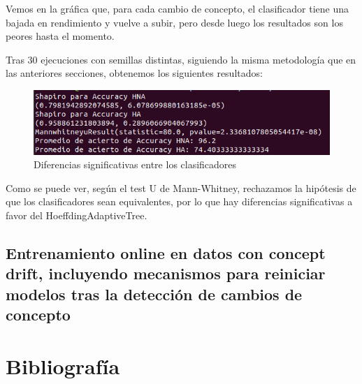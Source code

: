 Vemos en la gráfica que, para cada cambio de concepto, el clasificador tiene una bajada en rendimiento y vuelve a subir, pero desde luego los resultados son los peores hasta el momento.

Tras 30 ejecuciones con semillas distintas, siguiendo la misma metodología que en las anteriores secciones, obtenemos los siguientes resultados:

\begin{figure}[H] %
	\centering
	\includegraphics[scale=0.5]{test4.png}  %
	\caption{Diferencias significativas entre los clasificadores} 
	\label{fig:test4}
\end{figure}

Como se puede ver, según el test U de Mann-Whitney, rechazamos la hipótesis de que los clasificadores sean equivalentes, por lo que hay diferencias significativas a favor del HoeffdingAdaptiveTree.
\subsection{Entrenamiento online en datos con concept drift, incluyendo mecanismos para reiniciar modelos tras la detección de cambios de concepto}




\newpage
\section{Bibliografía}




